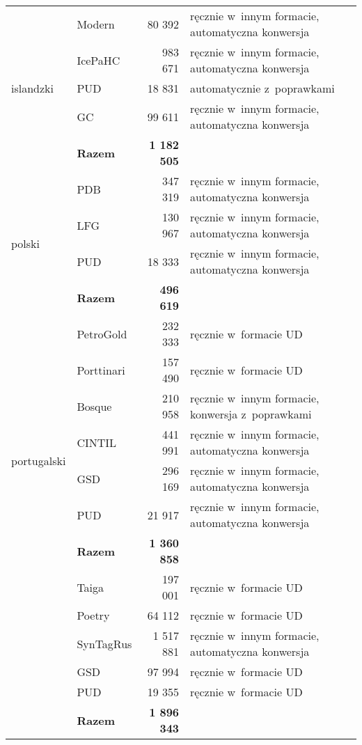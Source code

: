 \begin{table}[!h]
\begin{tabular}{llrl}
        \multirow{5}{*}{islandzki} & Modern & 80 392 & ręcznie w~innym formacie, automatyczna konwersja \\
        ~ & IcePaHC & 983 671 & ręcznie w~innym formacie, automatyczna konwersja \\
        ~ & PUD & 18 831 & automatycznie z~poprawkami \\
        ~ & GC & 99 611 & ręcznie w~innym formacie, automatyczna konwersja \\ 
        ~ & \textbf{Razem} & \textbf{1 182 505} \\ \midrule
        
        \multirow{4}{*}{polski} & PDB & 347 319 & ręcznie w~innym formacie, automatyczna konwersja \\
        ~ & LFG & 130 967 & ręcznie w~innym formacie, automatyczna konwersja \\
        ~ & PUD & 18 333 & ręcznie w~innym formacie, automatyczna konwersja \\ 
        ~ & \textbf{Razem} & \textbf{496 619} \\ \midrule
        
        \multirow{8}{*}{portugalski} & PetroGold & 232 333 & ręcznie w~formacie UD \\
        ~ & Porttinari & 157 490 & ręcznie w~formacie UD \\
        ~ & Bosque & 210 958 & ręcznie w~innym formacie, konwersja z~poprawkami \\
        ~ & CINTIL & 441 991 & ręcznie w~innym formacie, automatyczna konwersja \\
        ~ & GSD & 296 169 & ręcznie w~innym formacie, automatyczna konwersja \\
        ~ & PUD & 21 917 & ręcznie w~innym formacie, automatyczna konwersja \\ 
        ~ & \textbf{Razem} & \textbf{1 360 858} \\ \midrule
        
        \multirow{6}{*}{rosyjski} & Taiga & 197 001 & ręcznie w~formacie UD \\
        ~ & Poetry & 64 112 & ręcznie w~formacie UD \\
        ~ & SynTagRus & 1 517 881 & ręcznie w~innym formacie, automatyczna konwersja \\
        ~ & GSD & 97 994 & ręcznie w~formacie UD \\
        ~ & PUD & 19 355 & ręcznie w~formacie UD \\ 
        ~ & \textbf{Razem} & \textbf{1 896 343} \\ 
        
        \bottomrule
    \end{tabular}
  \end{table}
        
